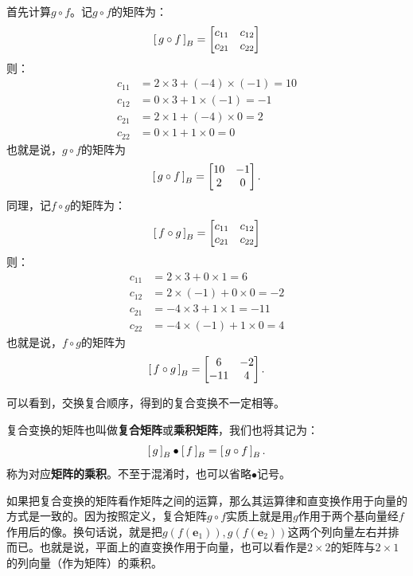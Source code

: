 \documentclass[12pt,UTF8,fontset=none]{ctexbook}
\begin{document}
\begin{so}
    首先计算$g\circ f$。记$g\circ f$的矩阵为：    
    $$
        \bmat{g\circ f}[B] = 
        \begin{bmatrix}
            c_{11} & c_{12} \\ c_{21} & c_{22}
        \end{bmatrix}
    $$
    则：
    \begin{align*}
        c_{11} &= 2 \times 3 + (-4)\times (-1) = 10 \\
        c_{12} &= 0 \times 3 + 1 \times (-1) = -1  \\
        c_{21} &= 2 \times 1 + (-4)\times 0 = 2  \\
        c_{22} &= 0 \times 1 + 1 \times 0 = 0  
    \end{align*}
    也就是说，$g\circ f$的矩阵为
    $$
        \bmat{g\circ f}[B] = 
        \begin{bmatrix}
            10 & -1 \\ 2 & 0
        \end{bmatrix}.
    $$
    同理，记$f\circ g$的矩阵为：    
    $$
        \bmat{f\circ g}[B] = 
        \begin{bmatrix}
            c_{11} & c_{12} \\ c_{21} & c_{22}
        \end{bmatrix}
    $$
    则：
    \begin{align*}
        c_{11} &= 2 \times 3 + 0 \times 1 = 6 \\
        c_{12} &= 2 \times (-1) + 0 \times 0 = -2  \\
        c_{21} &= -4 \times 3 + 1 \times 1 = -11  \\
        c_{22} &= -4 \times (-1) + 1 \times 0 = 4  
    \end{align*}
    也就是说，$f\circ g$的矩阵为
    $$
        \bmat{f\circ g}[B] = 
        \begin{bmatrix}
            6 & -2 \\ -11 & 4
        \end{bmatrix}.
    $$
\end{so}

可以看到，交换复合顺序，得到的复合变换不一定相等。

复合变换的矩阵也叫做\textbf{复合矩阵}或\textbf{乘积矩阵}，我们也将其记为：
$$ \bmat{g}[B] \bullet \bmat{f}[B] = \bmat{g\circ f}[B].$$
称为对应\textbf{矩阵的乘积}。不至于混淆时，也可以省略$\bullet$记号。

如果把复合变换的矩阵看作矩阵之间的运算，那么其运算律和直变换作用于向量的方式是一致的。因为按照定义，复合矩阵$g\circ f$实质上就是用$g$作用于两个基向量经$f$作用后的像。换句话说，就是把$g(f(\mathbf{e}_1)),g(f(\mathbf{e}_2))$这两个列向量左右并排而已。也就是说，平面上的直变换作用于向量，也可以看作是$2\times 2$的矩阵与$2\times 1$的列向量（作为矩阵）的乘积。
\end{document}
